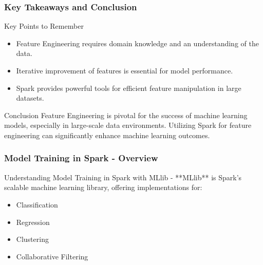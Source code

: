 \documentclass[aspectratio=169]{beamer}
\begin{document}
\begin{frame}[fragile]
    \frametitle{Key Takeaways and Conclusion}
    \begin{block}{Key Points to Remember}
        \begin{itemize}
            \item Feature Engineering requires domain knowledge and an understanding of the data.
            \item Iterative improvement of features is essential for model performance.
            \item Spark provides powerful tools for efficient feature manipulation in large datasets.
        \end{itemize}
    \end{block}
    
    \begin{block}{Conclusion}
        Feature Engineering is pivotal for the success of machine learning models, especially in large-scale data environments. Utilizing Spark for feature engineering can significantly enhance machine learning outcomes.
    \end{block}
\end{frame}

\begin{frame}[fragile]
    \frametitle{Model Training in Spark - Overview}
    \begin{block}{Understanding Model Training in Spark with MLlib}
        - **MLlib** is Spark's scalable machine learning library, offering implementations for:
        \begin{itemize}
            \item Classification
            \item Regression
            \item Clustering
            \item Collaborative Filtering
        \end{itemize}
    \end{block}
\end{frame}
\end{document}
